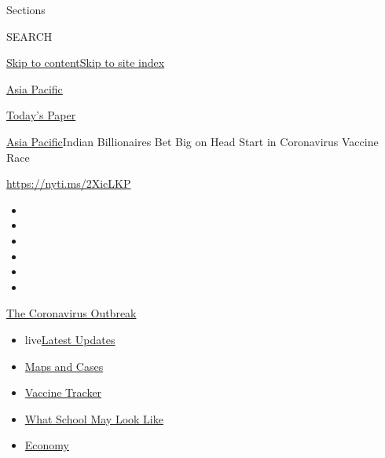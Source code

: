 Sections

SEARCH

\protect\hyperlink{site-content}{Skip to
content}\protect\hyperlink{site-index}{Skip to site index}

\href{https://www.nytimes3xbfgragh.onion/section/world/asia}{Asia
Pacific}

\href{https://myaccount.nytimes3xbfgragh.onion/auth/login?response_type=cookie\&client_id=vi}{}

\href{https://www.nytimes3xbfgragh.onion/section/todayspaper}{Today's
Paper}

\href{/section/world/asia}{Asia Pacific}\textbar{}Indian Billionaires
Bet Big on Head Start in Coronavirus Vaccine Race

\url{https://nyti.ms/2XicLKP}

\begin{itemize}
\item
\item
\item
\item
\item
\item
\end{itemize}

\href{https://www.nytimes3xbfgragh.onion/news-event/coronavirus?action=click\&pgtype=Article\&state=default\&region=TOP_BANNER\&context=storylines_menu}{The
Coronavirus Outbreak}

\begin{itemize}
\tightlist
\item
  live\href{https://www.nytimes3xbfgragh.onion/2020/08/01/world/coronavirus-covid-19.html?action=click\&pgtype=Article\&state=default\&region=TOP_BANNER\&context=storylines_menu}{Latest
  Updates}
\item
  \href{https://www.nytimes3xbfgragh.onion/interactive/2020/us/coronavirus-us-cases.html?action=click\&pgtype=Article\&state=default\&region=TOP_BANNER\&context=storylines_menu}{Maps
  and Cases}
\item
  \href{https://www.nytimes3xbfgragh.onion/interactive/2020/science/coronavirus-vaccine-tracker.html?action=click\&pgtype=Article\&state=default\&region=TOP_BANNER\&context=storylines_menu}{Vaccine
  Tracker}
\item
  \href{https://www.nytimes3xbfgragh.onion/interactive/2020/07/29/us/schools-reopening-coronavirus.html?action=click\&pgtype=Article\&state=default\&region=TOP_BANNER\&context=storylines_menu}{What
  School May Look Like}
\item
  \href{https://www.nytimes3xbfgragh.onion/live/2020/07/31/business/stock-market-today-coronavirus?action=click\&pgtype=Article\&state=default\&region=TOP_BANNER\&context=storylines_menu}{Economy}
\end{itemize}

